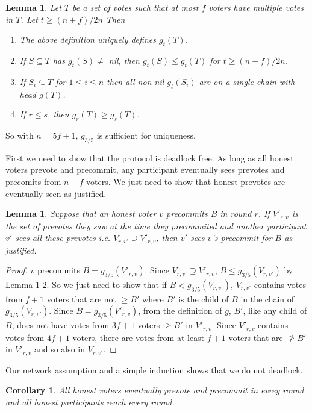 \documentclass{article}
\newtheorem{lemma}[theorem]{Lemma}
\newtheorem{corollary}[theorem]{Corollary}
\begin{document}
{\begin{lemma} \label{lem:ghost-monotonicity-general}
Let $T$ be a set of votes such that at most $f$ voters have multiple votes in $T$. Let $t \geq (n+f)/2n$ Then
\begin{enumerate}
\item The above definition uniquely defines $g_t(T)$.
\item If $S \subseteq T$ has $g_t(S) \neq$ nil, then $g_t(S) \leq g_t(T)$ for $t \geq (n+f)/2n$.
\item If $S_i \subseteq T$ for $1 \leq i \leq n$ then all non-nil $g_t(S_i)$ are on a single chain with head $g(T)$.
\item If $r \leq s$, then $g_r(T) \geq g_s(T)$.
\end{enumerate}
\end{lemma}
So with $n=5f+1$, $g_{3/5}$ is sufficient for uniqueness.

First we need to show that the protocol is deadlock free. As long as all honest voters prevote and precommit, any participant eventually sees prevotes and precomits from $n-f$ voters. We just need to show that honest prevotes are eventually seen as justified.
\begin{lemma} Suppose that an honest voter $v$ precommits $B$ in round $r$. If $V'_{r,v}$ is the set of prevotes they saw at the time they precommited and another participant $v'$ sees all these prevotes i.e. $V_{r,v'} \supseteq V'_{r,v}$, then $v'$ sees $v$'s precommit for $B$ as justified. \end{lemma}
\begin{proof} $v$ precommits $B = g_{3/5}(V'_{r,v})$. Since $V_{r,v'} \supseteq V'_{r,v}$, $B \leq g_{3/5}(V_{r,v'})$ by Lemma \ref{lem:ghost-monotonicity-general} 2. So we just need to show that if  $B < g_{3/5}(V_{r,v'})$, $V_{r,v'}$ contains votes from $f+1$ voters that are not $\geq B'$ where $B'$ is the child of $B$ in the chain of $g_{3/5}(V_{r,v'})$. Since $B = g_{3/5}(V'_{r,v})$, from the definition of $g$, $B'$, like any child of $B$, does not have votes from $3f+1$ voters $\geq B'$ in $V'_{r,v}$. Since $V'_{r,v}$ contains votes from $4f+1$ voters, there are votes from at least $f+1$ voters that are $\not \geq B'$ in $V'_{r,v}$ and so also in $V_{r,v'}$.
\end{proof}

Our network assumption and a simple induction shows that we do not deadlock.
\begin{corollary} All honest voters eventually prevote and precommit in evrey round and all honest participants reach every round.\end{corollary}

}
\end{document}
